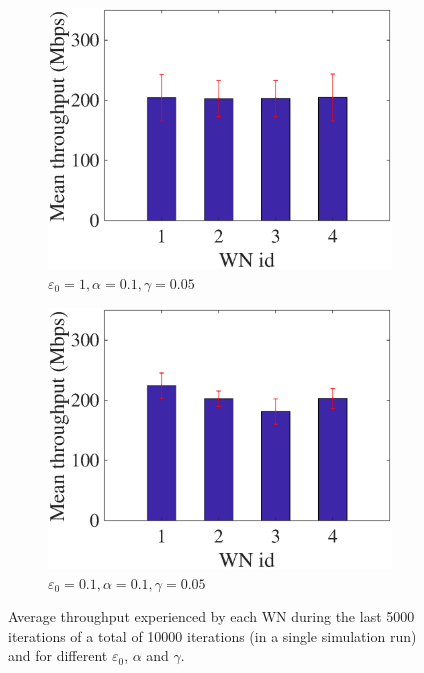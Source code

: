 \documentclass[conference]{IEEEtran}
\begin{document}
\begin{figure}[]
\begin{subfigure}[b]{0.225\textwidth}
			\includegraphics[width=\textwidth]{images/e_1_a_01_g_005_avg_tpt}
			\caption{$\varepsilon_0=1, \alpha=0.1, \gamma=0.05$}
			\label{fig:e_1_a_0.1_g_0.05_avg_tpt}
		\end{subfigure}
		\begin{subfigure}[b]{0.225\textwidth}
			\includegraphics[width=\textwidth]{images/e_01_a_01_g_005_avg_tpt}
			\caption{$\varepsilon_0=0.1, \alpha=0.1, \gamma=0.05$}
			\label{fig:e_0.1_a_0.1_g_0.05_avg_tpt}
		\end{subfigure}
		\caption{Average throughput experienced by each WN during the last 5000 iterations of a total of 10000 iterations (in a single simulation run) and for different $\varepsilon_0$, $\alpha$ and $\gamma$.}
		\label{fig:ql_params_eval_average_tpt}
	\end{figure}
	
\end{document}

